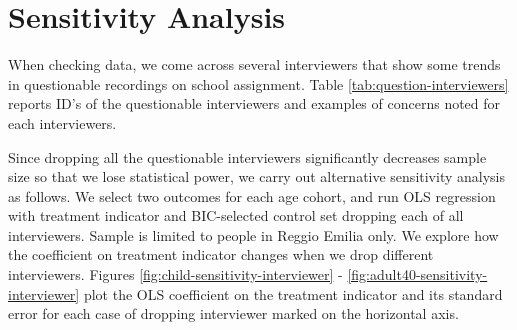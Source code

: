 


\doublespacing

\section{Sensitivity Analysis}

When checking data, we come across several interviewers that show some trends in questionable recordings on school assignment. Table \ref{tab:question-interviewers} reports ID's of the questionable interviewers and examples of concerns noted for each interviewers. 

Since dropping all the questionable interviewers significantly decreases sample size so that we lose statistical power, we carry out alternative sensitivity analysis as follows. We select two outcomes for each age cohort, and run OLS regression with treatment indicator and BIC-selected control set dropping each of all interviewers. Sample is limited to people in Reggio Emilia only. We explore how the coefficient on treatment indicator changes when we drop different interviewers. Figures \ref{fig:child-sensitivity-interviewer} - \ref{fig:adult40-sensitivity-interviewer} plot the OLS coefficient on the treatment indicator and its standard error for each case of dropping interviewer marked on the horizontal axis.



